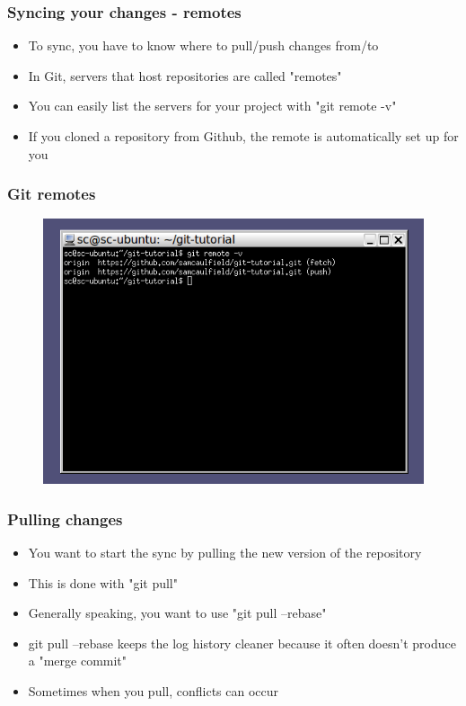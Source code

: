 \documentclass{beamer}
\begin{document}
\begin{frame}
\frametitle{Syncing your changes - remotes}
\begin{itemize}
\item To sync, you have to know where to pull/push changes from/to
\item In Git, servers that host repositories are called "remotes"
\item You can easily list the servers for your project with "git remote -v"
\item If you cloned a repository from Github, the remote is automatically set up for you
\end{itemize}
\begin{figure}
\end{figure}
\end{frame}

\begin{frame}
\frametitle{Git remotes}
\begin{figure}
\includegraphics[scale=0.5]{gitremotev}
\end{figure}
\end{frame}

\begin{frame}
\frametitle{Pulling changes}
\begin{itemize}
\item You want to start the sync by pulling the new version of the repository
\item This is done with "git pull"
\item Generally speaking, you want to use "git pull --rebase"
\item git pull --rebase keeps the log history cleaner because it often doesn't produce a "merge commit"
\item Sometimes when you pull, conflicts can occur
\end{itemize}
\begin{figure}
\end{figure}
\end{frame}
\end{document}
